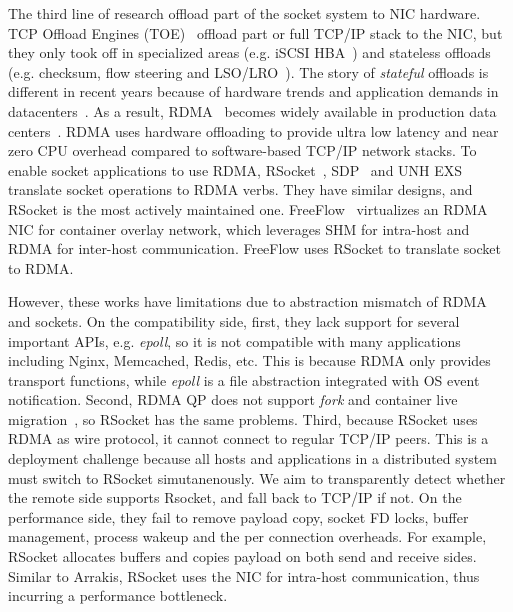 The third line of research offload part of the socket system to NIC hardware.
TCP Offload Engines (TOE)~\cite{tcp-chimney-offload} offload part or full TCP/IP stack to the NIC, but they only took off in specialized areas (e.g. iSCSI HBA~\cite{iscsi-hba}) and stateless offloads (e.g. checksum, flow steering and LSO/LRO~\cite{lsolro}).
The story of \emph{stateful} offloads is different in recent years because of hardware trends and application demands in datacenters~\cite{chuanxiong-rdma-keynote}.
As a result, RDMA~\cite{infiniband2000infiniband} becomes widely available in production data centers~\cite{guo2016rdma}.
RDMA uses hardware offloading to provide ultra low latency and near zero CPU overhead compared to software-based TCP/IP network stacks.
To enable socket applications to use RDMA, RSocket~\cite{rsockets}, SDP~\cite{socketsdirect} and UNH EXS~\cite{russell2008extended} translate socket operations to RDMA verbs.
They have similar designs, and RSocket is the most actively maintained one.
FreeFlow~\cite{nsdi19freeflow} virtualizes an RDMA NIC for container overlay network, which leverages SHM for intra-host and RDMA for inter-host communication.
FreeFlow uses RSocket to translate socket to RDMA.

However, these works have limitations due to abstraction mismatch of RDMA and sockets.
On the compatibility side, first, they lack support for several important APIs, e.g. \textit{epoll}, so it is not compatible with many applications including Nginx, Memcached, Redis, etc.
This is because RDMA only provides transport functions, while \textit{epoll} is a file abstraction integrated with OS event notification.
Second, RDMA QP does not support \textit{fork} and container live migration~\cite{nsdi19freeflow}, so RSocket has the same problems.
Third, because RSocket uses RDMA as wire protocol, it cannot connect to regular TCP/IP peers.
This is a deployment challenge because all hosts and applications in a distributed system must switch to RSocket simutanenously.
We aim to transparently detect whether the remote side supports Rsocket, and fall back to TCP/IP if not.
On the performance side, they fail to remove payload copy, socket FD locks, buffer management, process wakeup and the per connection overheads.
For example, RSocket allocates buffers and copies payload on both send and receive sides.
Similar to Arrakis, RSocket uses the NIC for intra-host communication, thus incurring a performance bottleneck.


